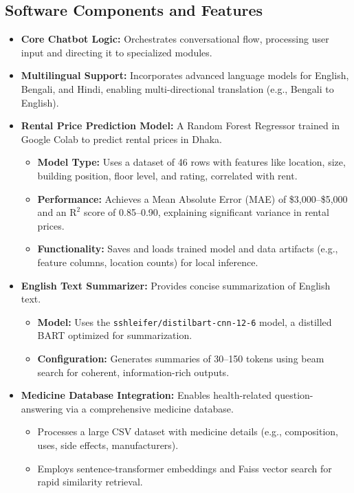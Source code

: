 \documentclass[a4paper,10pt,conference]{IEEEtran}
\begin{document}
\subsection{Software Components and Features}
\begin{itemize}
    \item \textbf{Core Chatbot Logic:} Orchestrates conversational flow, processing user input and directing it to specialized modules.
    \item \textbf{Multilingual Support:} Incorporates advanced language models for English, Bengali, and Hindi, enabling multi-directional translation (e.g., Bengali to English).
    \item \textbf{Rental Price Prediction Model:} A Random Forest Regressor trained in Google Colab to predict rental prices in Dhaka.
    \begin{itemize}
        \item \textbf{Model Type:} Uses a dataset of 46 rows with features like location, size, building position, floor level, and rating, correlated with rent.
        \item \textbf{Performance:} Achieves a Mean Absolute Error (MAE) of \$3,000--\$5,000 and an $\mathrm{R}^2$ score of 0.85--0.90, explaining significant variance in rental prices.
        \item \textbf{Functionality:} Saves and loads trained model and data artifacts (e.g., feature columns, location counts) for local inference.
    \end{itemize}
    \item \textbf{English Text Summarizer:} Provides concise summarization of English text.
    \begin{itemize}
        \item \textbf{Model:} Uses the \texttt{sshleifer/distilbart-cnn-12-6} model, a distilled BART optimized for summarization.
        \item \textbf{Configuration:} Generates summaries of 30--150 tokens using beam search for coherent, information-rich outputs.
    \end{itemize}
    \item \textbf{Medicine Database Integration:} Enables health-related question-answering via a comprehensive medicine database.
    \begin{itemize}
        \item Processes a large CSV dataset with medicine details (e.g., composition, uses, side effects, manufacturers).
        \item Employs sentence-transformer embeddings and Faiss vector search for rapid similarity retrieval.

\end{itemize}
\end{itemize}
\end{document}
